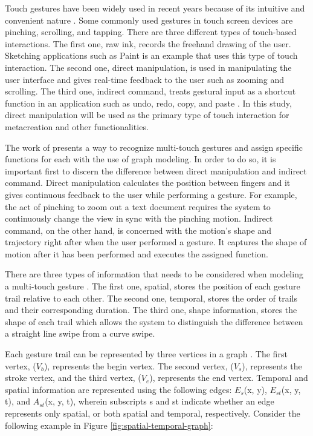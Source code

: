 Touch gestures have been widely used in recent years because of its intuitive and convenient nature \citep{chen2014agraph}. Some commonly used gestures in touch screen devices are pinching, scrolling, and tapping. There are three different types of touch-based interactions. The first one, raw ink, records the freehand drawing of the user. Sketching applications such as Paint is an example that uses this type of touch interaction. The second one, direct manipulation, is used in manipulating the user interface and gives real-time feedback to the user such as zooming and scrolling. The third one, indirect command, treats gestural input as a shortcut function in an application such as undo, redo, copy, and paste \citep{chen2014agraph}. In this study, direct manipulation will be used as the primary type of touch interaction for metacreation and other functionalities. 
            
The work of \citet{chen2014agraph} presents a way to recognize multi-touch gestures and assign specific functions for each with the use of graph modeling. In order to do so, it is important first to discern the difference between direct manipulation and indirect command. Direct manipulation calculates the position between fingers and it gives continuous feedback to the user while performing a gesture. For example, the act of pinching to zoom out a text document requires the system to continuously change the view in sync with the pinching motion. Indirect command, on the other hand, is concerned with the motion's shape and trajectory right after when the user performed a gesture. It captures the shape of motion after it has been performed and executes the assigned function. 

There are three types of information that needs to be considered when modeling a multi-touch gesture \citep{chen2014agraph}. The first one, spatial, stores the position of each gesture trail relative to each other. The second one, temporal, stores the order of trails and their corresponding duration. The third one, shape information, stores the shape of each trail which allows the system to distinguish the difference between a straight line swipe from a curve swipe.

Each gesture trail can be represented by three vertices in a graph \citep{chen2014agraph}. The first vertex, ($V_b$), represents the begin vertex. The second vertex, ($V_s$), represents the stroke vertex, and the third vertex, ($V_e$), represents the end vertex. Temporal and spatial information are represented using the following edges: $E_s$(x, y), $E_{st}$(x, y, t), and $A_{st}$(x, y, t), wherein subscripts s and st indicate whether an edge represents only spatial, or both spatial and temporal, respectively. Consider the following example in Figure \ref{fig:spatial-temporal-graph}:

